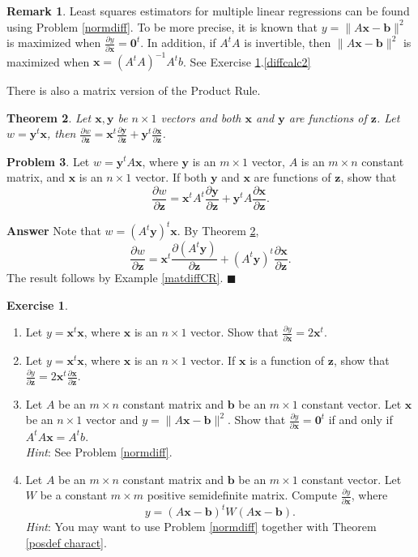 \documentclass[12pt,letterpaper]{book}
\numberwithin{equation}{section}
\newtheorem{thm}{\textbf{Theorem}}[section]
\theoremstyle{definition}
\newtheorem{problem}[thm]{\textbf{Problem}}
\newtheorem{remark}[thm]{\textbf{Remark}}
\newtheorem{exercise}{\textbf{Exercise}}[chapter]
\newenvironment{answer}{\noindent\textbf{Answer}}{\hfill$\blacksquare$\vspace{0.1in}}
\newcommand{\vx}{\bm{x}}
\newcommand{\vy}{\bm{y}}
\newcommand{\vz}{\bm{z}}
\newcommand{\vb}{\bm{b}}
\begin{document}
\begin{remark}
Least squares estimators for multiple linear regressions can be found using Problem \ref{normdiff}. To be more precise, it is known that $y=\|A\vx -\vb\|^2$ is maximized when $\frac{\partial y}{\partial \vx}=\bm{0}^t$. In addition, if $A^tA$ is invertible, then $\|A\vx -\vb\|^2$ is maximized when $\vx=(A^tA)^{-1}A^tb$. See Exercise \ref{matdiffexer}.\ref{diffcalc2}
\end{remark}

There is also a matrix version of the Product Rule.

\begin{thm}\label{matdiffPR}
Let $\vx,\vy$ be $n\times 1$ vectors and both $\vx$ and $\vy$ are functions of $\vz$. Let $w=\vy^t\vx$, then $\frac{\partial w}{\partial \vz}=\vx^t\frac{\partial \vy}{\partial \vz}+\vy^t\frac{\partial \vx}{\partial \vz}$.
\end{thm}

\begin{problem}
Let $w=\vy^tA\vx$, where $\vy$ is an $m\times 1$ vector, $A$ is an $m\times n$ constant matrix, and $\vx$ is an $n\times 1$ vector. If both $\vy$ and $\vx$ are functions of $\vz$, show that
$$\frac{\partial w}{\partial \vz}=\vx^tA^t\frac{\partial \vy}{\partial \vz}+\vy^tA\frac{\partial \vx}{\partial \vz}.$$
\end{problem}

\begin{answer}
Note that $w=(A^t\vy)^t\vx$. By Theorem \ref{matdiffPR},
$$\frac{\partial w}{\partial \vz}=\vx^t\frac{\partial (A^t\vy)}{\partial \vz}+(A^t\vy)^t\frac{\partial \vx}{\partial \vz}.$$ The result follows by Example \ref{matdiffCR}.
\end{answer}

\begin{exercise}\quad\label{matdiffexer}
\begin{enumerate}[\bfseries 1.]
\item Let $y=\vx^t\vx$, where $\vx$ is an $n\times 1$ vector. Show that $\frac{\partial y}{\partial \vx}=2\vx^t$.
\item Let $y=\vx^t\vx$, where $\vx$ is an $n\times 1$ vector. If $\vx$ is a function of $\vz$, show that $\frac{\partial y}{\partial \vz}=2\vx^t\frac{\partial \vx}{\partial \vz}$.
\item \label{diffcalc2} Let $A$ be an $m\times n$ constant matrix and $\bm{b}$ be an $m\times 1$ constant vector. Let $\vx$ be an $n\times 1$ vector and $y=\|A\vx-\bm{b}\|^2$. Show that $\frac{\partial y}{\partial \vx}=\bm{0}^t$ if and only if $A^tA\vx=A^tb$.\\
\textit{Hint}: See Problem \ref{normdiff}.
\item Let $A$ be an $m\times n$ constant matrix and $\bm{b}$ be an $m\times 1$ constant vector. Let $W$ be a constant $m\times m$ positive semidefinite matrix. Compute $\frac{\partial y}{\partial \vx}$, where
$$y=(A\vx-\vb)^tW(A\vx-\vb).$$
\textit{Hint}: You may want to use Problem \ref{normdiff} together with Theorem \ref{posdef charact}.
\end{enumerate}
\end{exercise}
\end{document}
